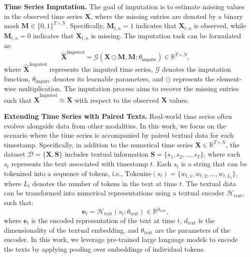 \textbf{Time Series Imputation.} The goal of imputation is to estimate missing values in the observed time series $\mathbf{X}$, where the missing entries are denoted by a binary mask $\mathbf{M} \in \{0, 1\}^{T \times N}$. Specifically, $\mathbf{M}_{t,n}=1$ indicates that $\mathbf{X}_{t,n}$ is observed, while $\mathbf{M}_{t,n}=0$ indicates that $\mathbf{X}_{t,n}$ is missing. The imputation task can be formulated as:
\begin{equation}
\widehat{\mathbf{X}}^{\text{Imputed}} = \mathcal{G}\left(\mathbf{X} \odot \mathbf{M}, \mathbf{M}; \theta_{\text{impute}} \right) \in \mathbb{R}^{T \times N},
\end{equation}
where $\widehat{\mathbf{X}}^{\text{Imputed}}$ represents the imputed time series, $\mathcal{G}$ denotes the imputation function, $\theta_{\text{impute}}$ denotes its learnable parameters, and $\odot$ represents the element-wise multiplication. The imputation process aims to recover the missing entries such that $\widehat{\mathbf{X}}^{\text{Imputed}} \approx \mathbf{X}$ with respect to the observed $\mathbf{X}$ values.

\textbf{Extending Time Series with Paired Texts.} 
Real-world time series often evolves alongside data from other modalities.
In this work, we focus on the scenario where the time series is accompanied by paired textual data for each timestamp. Specifically, in addition to the numerical time series $\bm{X} \in \mathbb{R}^{T \times N}$, the dataset $\mathcal{D} = \{\bm{X}, \bm{S}\}$ includes textual information $\bm{S} = \{s_1, s_2, \dots, s_T\}$, where each $s_t$ represents the text associated with timestamp $t$. Each $s_t$ is a string that can be tokenized into a sequence of tokens, i.e., $\text{Tokenize}(s_t) = \{w_{t,1}, w_{t,2}, \dots, w_{t,L_t}\}$, where $L_t$ denotes the number of tokens in the text at time $t$.
 The textual data can be transformed into numerical representations using a textual encoder $\mathcal{H}_{\text{text}}$, such that:
\begin{equation}
\bm{e}_t = \mathcal{H}_{\text{text}}(s_t; \theta_{\text{text}}) \in \mathbb{R}^{d_{\text{text}}},
\end{equation}
where $\bm{e}_t$ is the encoded representation of the text at time $t$, $d_{\text{text}}$ is the dimensionality of the textual embedding, and $\theta_{\text{text}}$ are the parameters of the encoder. In this work, we leverage pre-trained large language models to encode the texts by applying pooling over embeddings of individual tokens.
